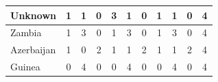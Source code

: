 \documentclass[12pt]{article}  %
\begin{document}
\begin{subappendices}
\begin{longtable}{|l|c|c|c|c|c|c|c|c|c|c|}
	\hline
	Unknown                                                        & 1                                                                      & 1                                                                      & 0                                                                      & 3                                                                      & 1                                                                      & 0                                                                      & 1                         & 1                           & 0                           & 4                           \\ 
	\hline
	Zambia                                                         & 1                                                                      & 3                                                                      & 0                                                                      & 1                                                                      & 3                                                                      & 0                                                                      & 1                         & 3                           & 0                           & 4                           \\ 
	\hline
	Azerbaijan                                                     & 1                                                                      & 0                                                                      & 2                                                                      & 1                                                                      & 1                                                                      & 2                                                                      & 1                         & 1                           & 2                           & 4                           \\ 
	\hline
	Guinea                                                         & 0                                                                      & 4                                                                      & 0                                                                      & 0                                                                      & 4                                                                      & 0                                                                      & 0                         & 4                           & 0                           & 4                           \\ 

\end{longtable}
\end{subappendices}
\end{document}
